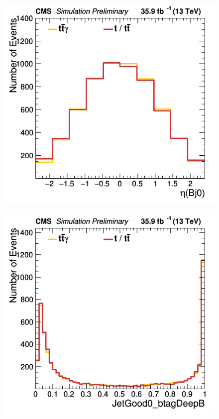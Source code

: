\documentclass[11pt]{scrartcl}
\begin{document}
\begin{figure}[H]
\centering
\begin{minipage}{.5\textwidth}
  \centering
  \includegraphics[width=0.75\linewidth]{figures/Notused/Bj0_eta.png}
  \label{fig:Bj0eta}
\end{minipage}%
\begin{minipage}{.5\textwidth}
  \centering
  \includegraphics[width=0.75\linewidth]{figures/Notused/JetGood0_btagDeepB.png}
  \label{fig:JetGood0btagDeepB}
\end{minipage}
\end{figure}
\end{document}
